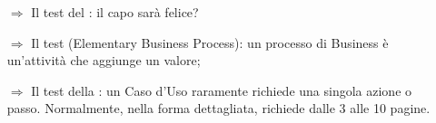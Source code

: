 
\begin{itemize}
    \item [$\Rightarrow$] Il test del : il capo sarà felice?
    \item [$\Rightarrow$] Il test  (Elementary Business Process): un processo di Business è un'attività che aggiunge un valore;
    \item [$\Rightarrow$] Il test della : un Caso d'Uso raramente richiede una singola azione o passo. Normalmente, nella forma dettagliata, richiede dalle 3 alle 10 pagine.
\end{itemize}

